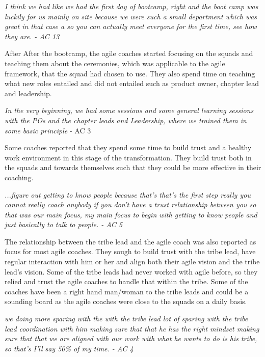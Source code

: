\documentclass[11pt,a4paper]{report}
\begin{document}
\begin{displayquote}
\textit{
I think we had like we had the first day of bootcamp, right and the boot camp was luckily for us mainly on site because we were such a small department which was great in that case a so you can actually meet everyone for the first time, see how they are. - AC 13
}
\end{displayquote}

\noindent After After the bootcamp, the agile coaches started focusing on the squads and teaching them about the ceremonies, which was applicable to the agile framework, that the squad had chosen to use. They also spend time on teaching what new roles entailed and did not entailed such as product owner, chapter lead and leadership. 

\begin{displayquote}
\textit{
In the very beginning, we had some sessions and some general learning sessions with the POs and the chapter leads and Leadership, where we trained them in some basic principle
} - AC 3
\end{displayquote}

\noindent Some coaches reported that they spend some time to build trust and a healthy work environment in this stage of the transformation. They build trust both in the squads and towards themselves such that they could be more effective in their coaching. 

\begin{displayquote}
\textit{
...figure out getting to know people because that's that's the first step really you cannot really coach anybody if you don't have a trust relationship between you so that was our main focus, my main focus to begin with getting to know people and just basically to talk to people. - AC 5
}
\end{displayquote}

\noindent The relationship between the tribe lead and the agile coach was also reported as focus for most agile coaches. They sough to build trust with the tribe lead, have regular interaction with him or her and align both their agile vision and the tribe lead's vision. Some of the tribe leads had never worked with agile before, so they relied and trust the agile coaches to handle that within the tribe. Some of the coaches have been a right hand man/woman to the tribe leads and could be a sounding board as the agile coaches were close to the squads on a daily basis.

\begin{displayquote}
\textit{
we doing more sparing with the with the tribe lead lot of sparing with the tribe lead coordination with him making sure that that he has the right mindset making sure that that we are aligned with our work with what he wants to do is his tribe, so that's I'll say 50\% of my time. - AC 4
}
\end{displayquote}
\end{document}
